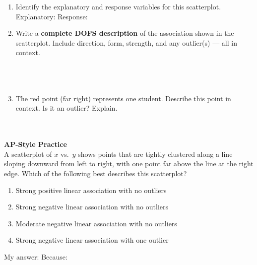 \documentclass[10pt]{article}
\begin{document}
\vspace{0.2in}

\begin{enumerate}[leftmargin=1.6em, itemsep=0.2in]

    \item Identify the explanatory and response variables for this scatterplot.\\[10pt]
          Explanatory: \blank{5.5cm} \quad Response: \blank{5.5cm}

    \item Write a \textbf{complete DOFS description} of the association shown in the scatterplot.
          Include direction, form, strength, and any outlier(s) --- all in context.\\[10pt]
          \writeline\\[3pt]\writeline\\[3pt]\writeline\\[3pt]\writeline

    \item The red point (far right) represents one student. Describe this point in context.
          Is it an outlier? Explain.\\[10pt]
          \writeline\\[3pt]\writeline\\[3pt]\writeline

\end{enumerate}

\vspace{0.16in}

\begin{tcolorbox}[colback=redbg, colframe=redacc, boxrule=0.8pt, arc=2mm,
    left=4mm, right=4mm, top=3mm, bottom=3mm]
\small\textbf{AP-Style Practice}\\[6pt]
A scatterplot of $x$ vs.\ $y$ shows points that are tightly clustered along a line sloping
downward from left to right, with one point far above the line at the right edge. Which of the
following best describes this scatterplot?

\vspace{10pt}
\begin{enumerate}[label=\textbf{(\Alph*)}, leftmargin=2em, itemsep=6pt]
  \item Strong positive linear association with no outliers
  \item Strong negative linear association with no outliers
  \item Moderate negative linear association with no outliers
  \item Strong negative linear association with one outlier
\end{enumerate}
\end{tcolorbox}

\vspace{0.1in}
\noindent\textcolor{slate}{\small My answer: \blank{1cm} \quad Because: \blank{8.5cm}}
\end{document}
